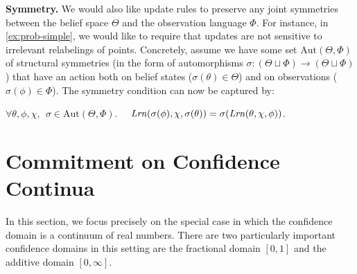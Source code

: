 \textbf{Symmetry.}
We would also like update rules to preserve any joint symmetries between the belief space $\Theta$ and the observation language $\Phi$.
For instance, in \cref{ex:prob-simple}, we would like to require that updates are not sensitive to irrelevant relabelings of points.
Concretely, assume we have some set $\mathrm{Aut}(\Theta, \Phi)$ of 
	structural symmetries
	(in the form of automorphisms $\sigma : (\Theta \sqcup \Phi) \to (\Theta \sqcup \Phi)$)
	that have an action both on belief states ($\sigma(\theta) \in \Theta$) and 
		on observations ($\sigma(\phi) \in \Phi$).
		The symmetry condition can now be captured by:
\begin{LrnAxioms}
	\item
	$\forall \theta,\phi,\chi,~~
	 \sigma
	\in \mathrm{Aut}(\Theta, \Phi)
	.\quad$
$\mathit{Lrn}(\sigma(\phi), \chi , \sigma(\theta)) = \sigma (\mathit{Lrn}(\theta,\chi, \phi))$.
	 \label{ax:symmetry}
\end{LrnAxioms}


\section{Commitment on Confidence Continua}
In this section, we focus precisely on the special case in which the confidence domain is a continuum of real numbers. 
There are two particularly important confidence domains in this setting are the fractional domain $[0,1]$ and the additive domain $[0,\infty]$.


